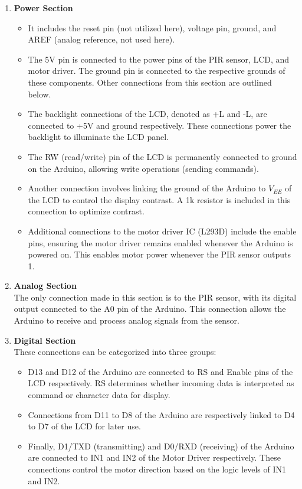 \documentclass{article}
\begin{document}
\begin{enumerate}
\item \textbf{Power Section}
\begin{itemize}
\item It includes the reset pin (not utilized here), voltage pin, ground, and AREF (analog reference, not used here).
\item The 5V pin is connected to the power pins of the PIR sensor, LCD, and motor driver. The ground pin is connected to the respective grounds of these components. Other connections from this section are outlined below.
\item The backlight connections of the LCD, denoted as +L and -L, are connected to +5V and ground respectively. These connections power the backlight to illuminate the LCD panel.
\item The RW (read/write) pin of the LCD is permanently connected to ground on the Arduino, allowing write operations (sending commands).
\item Another connection involves linking the ground of the Arduino to $V_{EE}$ of the LCD to control the display contrast. A 1k resistor is included in this connection to optimize contrast.
\item Additional connections to the motor driver IC (L293D) include the enable pins, ensuring the motor driver remains enabled whenever the Arduino is powered on. This enables motor power whenever the PIR sensor outputs 1.
\end{itemize}

\item \textbf{Analog Section} \\
The only connection made in this section is to the PIR sensor, with its digital output connected to the A0 pin of the Arduino. This connection allows the Arduino to receive and process analog signals from the sensor.

\item \textbf{Digital Section} \\
These connections can be categorized into three groups:
\begin{itemize}
\item D13 and D12 of the Arduino are connected to RS and Enable pins of the LCD respectively. RS determines whether incoming data is interpreted as command or character data for display.
\item Connections from D11 to D8 of the Arduino are respectively linked to D4 to D7 of the LCD for later use.
\item Finally, D1/TXD (transmitting) and D0/RXD (receiving) of the Arduino are connected to IN1 and IN2 of the Motor Driver respectively. These connections control the motor direction based on the logic levels of IN1 and IN2.
\end{itemize}
\end{enumerate}
\end{document}
